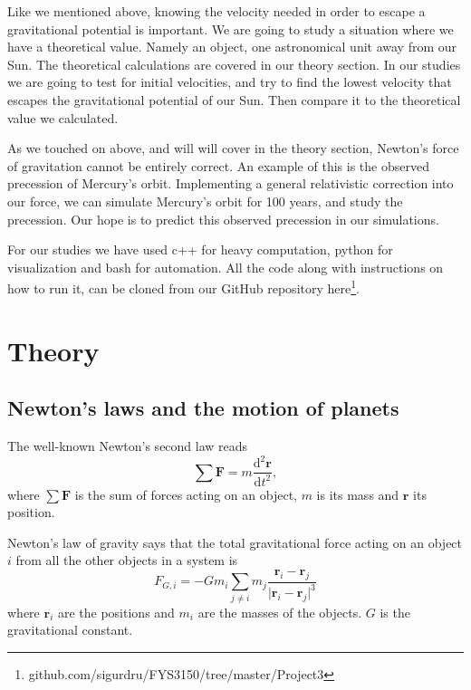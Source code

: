 \documentclass[reprint, english,notitlepage,nofootinbib]{revtex4-1}  %
\newcommand{\vc}[1]{\mathbf{#1}}
\begin{document}
Like we mentioned above, knowing the velocity needed in order to escape a gravitational potential is important. We are going to study a situation where we have a theoretical value. Namely an object, one astronomical unit away from our Sun. The theoretical calculations are covered in our theory section. In our studies we are going to test for initial velocities, and try to find the lowest velocity that escapes the gravitational potential of our Sun. Then compare it to the theoretical value we calculated.

As we touched on above, and will will cover in the theory section, Newton's force of gravitation cannot be entirely correct. An example of this is the observed precession of Mercury's orbit. Implementing a general relativistic correction into our force, we can simulate Mercury's orbit for 100 years, and study the precession. Our hope is to predict this observed precession in our simulations.

For our studies we have used c++ for heavy computation, python for visualization and bash for automation. All the code along with instructions on how to run it, can be cloned from our GitHub repository here\footnote{github.com/sigurdru/FYS3150/tree/master/Project3}.



\section{Theory}

\subsection{Newton's laws and the motion of planets}

The well-known Newton's second law reads
\begin{equation}
  \label{eq:Newton_2nd}
  \sum \vc F = m \frac{\mathrm d^2 \vc r}{\mathrm d t^2},
\end{equation}
where $\sum \vc F$ is the sum of forces acting on an object, $m$ is its mass and $\vc r$ its position.

Newton's law of gravity says that the total gravitational force acting on an object $i$ from all the other objects in a system is
\begin{equation}
  \label{eq:Newton_grav}
  F_{G, i} = - G m_i \sum_{j \neq i} m_j \frac{\vc r_i - \vc r_j}{ \lvert \vc r_i - \vc r_j \rvert ^3}
\end{equation}
where $\vc r_i$ are the positions and $m_i$ are the masses of the objects. $G$ is the gravitational constant.
\end{document}
